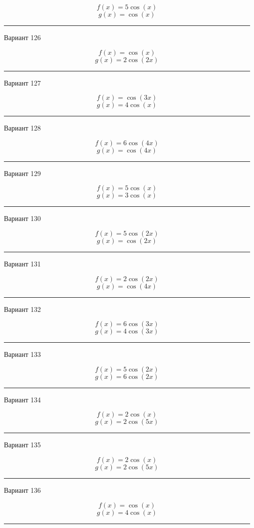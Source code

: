 \documentclass[11pt]{report}
\begin{document}
$$f(x)=5 \cos{\left(x \right)}$$
$$g(x)=\cos{\left(x \right)}$$

\rule{\textwidth}{.2mm}

Вариант 126

$$f(x)=\cos{\left(x \right)}$$
$$g(x)=2 \cos{\left(2 x \right)}$$

\rule{\textwidth}{.2mm}

Вариант 127

$$f(x)=\cos{\left(3 x \right)}$$
$$g(x)=4 \cos{\left(x \right)}$$

\rule{\textwidth}{.2mm}

Вариант 128

$$f(x)=6 \cos{\left(4 x \right)}$$
$$g(x)=\cos{\left(4 x \right)}$$

\rule{\textwidth}{.2mm}

Вариант 129

$$f(x)=5 \cos{\left(x \right)}$$
$$g(x)=3 \cos{\left(x \right)}$$

\rule{\textwidth}{.2mm}

Вариант 130

$$f(x)=5 \cos{\left(2 x \right)}$$
$$g(x)=\cos{\left(2 x \right)}$$

\rule{\textwidth}{.2mm}

Вариант 131

$$f(x)=2 \cos{\left(2 x \right)}$$
$$g(x)=\cos{\left(4 x \right)}$$

\rule{\textwidth}{.2mm}

Вариант 132

$$f(x)=6 \cos{\left(3 x \right)}$$
$$g(x)=4 \cos{\left(3 x \right)}$$

\rule{\textwidth}{.2mm}

Вариант 133

$$f(x)=5 \cos{\left(2 x \right)}$$
$$g(x)=6 \cos{\left(2 x \right)}$$

\rule{\textwidth}{.2mm}

Вариант 134

$$f(x)=2 \cos{\left(x \right)}$$
$$g(x)=2 \cos{\left(5 x \right)}$$

\rule{\textwidth}{.2mm}

Вариант 135

$$f(x)=2 \cos{\left(x \right)}$$
$$g(x)=2 \cos{\left(5 x \right)}$$

\rule{\textwidth}{.2mm}

Вариант 136

$$f(x)=\cos{\left(x \right)}$$
$$g(x)=4 \cos{\left(x \right)}$$

\rule{\textwidth}{.2mm}
\end{document}
